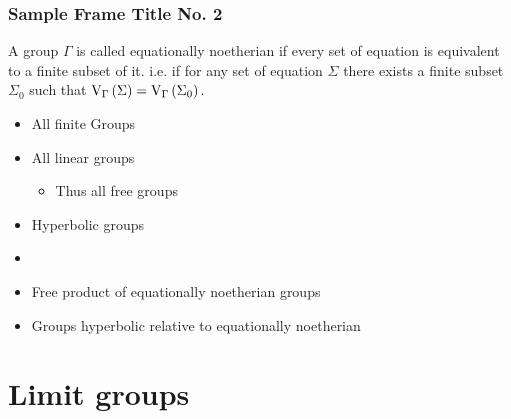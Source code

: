 \documentclass[handout]{beamer}[10]
\newcommand{\sol}{\text{V}_{\Gamma}}
\begin{document}
\begin{frame}

\frametitle{Sample Frame Title No. 2}

\begin{definition}
    A group $\Gamma$ is called equationally noetherian if  every set of equation is equivalent to a finite subset of it. \pause i.e. if for any set of equation $\Sigma$ there exists a finite subset $\Sigma_0$ such that $\sol\rb{\Sigma} = \sol\rb{\Sigma_0}$.
\end{definition}
\pause
\begin{example}\pause
    \begin{multicols}{2}
    \begin{itemize}
        \item All finite Groups \pause
        \item All linear groups\pause
            \begin{itemize}
                \item Thus all free groups\pause
            \end{itemize}
        \item Hyperbolic groups\\\pause
        \item[] 
        \item Free product of equationally noetherian groups\pause
        \item Groups hyperbolic relative to equationally noetherian
    \end{itemize}
    \end{multicols}
\end{example}

\end{frame}

\section{Limit groups}
\end{document}
